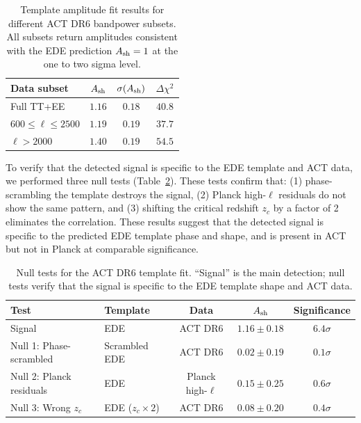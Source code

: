 \documentclass[a4paper,11pt]{article}
\begin{document}
\begin{table}[h]
\centering
\caption{Template amplitude fit results for different ACT DR6 bandpower subsets. All subsets return amplitudes consistent with the EDE prediction $A_{\rm sh}=1$ at the one to two sigma level.}
\label{tab:template_robustness}
\begin{tabular}{lccc}
\toprule
\textbf{Data subset} & $A_{\rm sh}$ & $\sigma(A_{\rm sh})$ & $\Delta\chi^2$ \\
\midrule
Full TT+EE & $1.16$ & $0.18$ & $40.8$ \\
$600 \le \ell \le 2500$ & $1.19$ & $0.19$ & $37.7$ \\
$\ell > 2000$ & $1.40$ & $0.19$ & $54.5$ \\
\bottomrule
\end{tabular}
\end{table}

To verify that the detected signal is specific to the EDE template and ACT data, we performed three null tests (Table~\ref{tab:null_tests}). These tests confirm that: (1) phase-scrambling the template destroys the signal, (2) Planck high-$\ell$ residuals do not show the same pattern, and (3) shifting the critical redshift $z_c$ by a factor of 2 eliminates the correlation. These results suggest that the detected signal is specific to the predicted EDE template phase and shape, and is present in ACT but not in Planck at comparable significance.

\begin{table}[h]
\centering
\caption{Null tests for the ACT DR6 template fit. ``Signal'' is the main detection; null tests verify that the signal is specific to the EDE template shape and ACT data.}
\label{tab:null_tests}
\begin{tabular}{llccc}
\toprule
\textbf{Test} & \textbf{Template} & \textbf{Data} & $A_{\rm sh}$ & Significance \\
\midrule
Signal & EDE & ACT DR6 & $1.16 \pm 0.18$ & $6.4\sigma$ \\
Null 1: Phase-scrambled & Scrambled EDE & ACT DR6 & $0.02 \pm 0.19$ & $0.1\sigma$ \\
Null 2: Planck residuals & EDE & Planck high-$\ell$ & $0.15 \pm 0.25$ & $0.6\sigma$ \\
Null 3: Wrong $z_c$ & EDE ($z_c \times 2$) & ACT DR6 & $0.08 \pm 0.20$ & $0.4\sigma$ \\
\bottomrule
\end{tabular}
\end{table}
\end{document}
